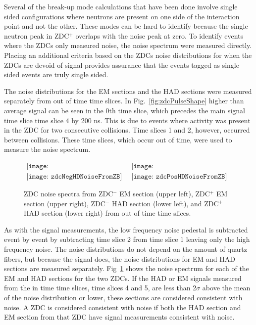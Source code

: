       Several of the break-up mode calculations that have been done involve
        single sided configurations where neutrons are present on one side
        of the interaction point and not the other.
      These modes can be hard to identify because the single neutron peak in 
        ZDC$^{+}$ overlaps with the noise peak at zero.
      To identify events where the ZDCs only measured noise, the noise
        spectrum were measured directly.
      Placing an additional criteria based on the ZDCs noise distributions for
        when the ZDCs are devoid of signal provides assurance that the events 
        tagged as single sided events are truly single sided.

      
      The noise distributions for the EM sections and the HAD sections were
        measured separately from out of time time slices.
      In Fig.~\ref{fig:zdcPulseShape} higher than average signal can be seen
        in the 0th time slice, which precedes the main signal time slice 
        time slice 4 by 200 ns. 
      This is due to events where activity was present in the ZDC for 
        two consecutive collisions.
      Time slices 1 and 2, however, occurred between collisions.
      These time slices, which occur out of time, were used to measure the 
        noise spectrum.
      \begin{figure}[!Hhbt]
        \centering
        $ \begin{array}{cc}
          \texttt{[image: zdcNegEMNoiseFromZBNoCor]} & 
          \texttt{[image: zdcPosEMNoiseFromZBNoCor]} \\
          \texttt{[image: zdcNegHDNoiseFromZB]} &
          \texttt{[image: zdcPosHDNoiseFromZB]}
        \end{array} $
        \caption{ZDC noise spectra from ZDC$^{-}$ EM section (upper left), 
          ZDC$^{+}$ EM section (upper right), ZDC$^{-}$ HAD section (lower left), 
          and ZDC$^{+}$ HAD section (lower right) from out of time time slices.}
        \label{fig:zdcNoiseSpectra}
      \end{figure}

      As with the signal measurements, the low frequency noise pedestal is 
        subtracted event by event by subtracting time slice 2 from time slice
        1 leaving only the high frequency noise.
      The noise distributions do not depend on the amount of quartz fibers, but
        because the signal does, the noise distributions for EM and HAD sections
        are measured separately.
      Fig~\ref{fig:zdcNoiseSpectra} shows the noise spectrum for each of the 
        EM and HAD sections for the two ZDCs.
      If the HAD or EM signals measured from the in time time slices, 
        time slices 4 and 5, are less than 2$\sigma$ above the mean of the 
        noise distribution or lower, these sections are considered consistent 
        with noise.
      A ZDC is considered consistent with noise if both the HAD section and EM 
        section from that ZDC have signal measurements consistent with noise.

